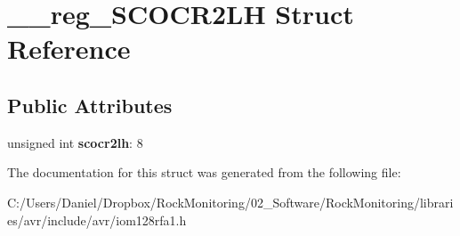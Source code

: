 \hypertarget{struct____reg___s_c_o_c_r2_l_h}{}\section{\+\_\+\+\_\+reg\+\_\+\+S\+C\+O\+C\+R2\+LH Struct Reference}
\label{struct____reg___s_c_o_c_r2_l_h}
\subsection*{Public Attributes}
\begin{DoxyCompactItemize}
\item 
unsigned int {\bfseries scocr2lh}\+: 8\hypertarget{struct____reg___s_c_o_c_r2_l_h_ac98eedd46af60f56430b4c0bdcd61412}{}\label{struct____reg___s_c_o_c_r2_l_h_ac98eedd46af60f56430b4c0bdcd61412}

\end{DoxyCompactItemize}


The documentation for this struct was generated from the following file\+:\begin{DoxyCompactItemize}
\item 
C\+:/\+Users/\+Daniel/\+Dropbox/\+Rock\+Monitoring/02\+\_\+\+Software/\+Rock\+Monitoring/libraries/avr/include/avr/iom128rfa1.\+h\end{DoxyCompactItemize}
